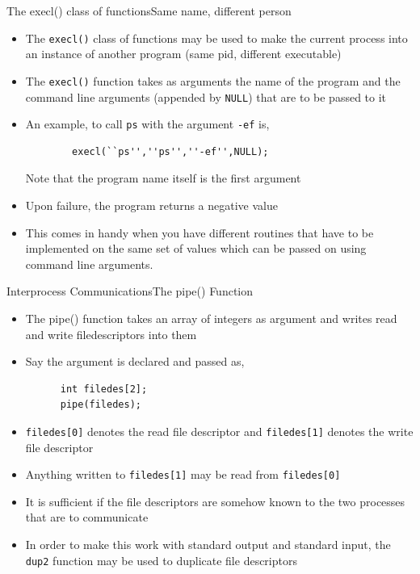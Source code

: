\documentclass{beamer}
\begin{document}
\begin{frame}[fragile]{The execl() class of functions}{Same name,
    different person}
  \begin{itemize}
    \item The \verb|execl()| class of functions may be used to make
      the current process into an instance of another program (same
      pid, different executable)
    \item The \verb|execl()| function takes as arguments the name of
      the program and the command line arguments (appended by
      \verb|NULL|) that are to be passed to it
      \item An example, to call \verb|ps| with the argument \verb|-ef|
        is,
    \begin{verbatim}
        execl(``ps'',''ps'',''-ef'',NULL);
    \end{verbatim}
    Note that the program name itself is the first argument
  \item Upon failure, the program returns a negative value
  \item This comes in handy when you have different routines that have
    to be implemented on the same set of values which can be passed on
    using command line arguments.
  \end{itemize}
\end{frame}

\begin{frame}[fragile]{Interprocess Communications}{The pipe() Function}
  \begin{itemize}
    \item The pipe() function takes an array of integers as argument
      and writes read and write filedescriptors into them
    \item Say the argument is declared and passed as,
    \begin{verbatim}
      int filedes[2];
      pipe(filedes);
    \end{verbatim}
    \item \verb|filedes[0]| denotes the read file descriptor and
      \verb|filedes[1]| denotes the write file descriptor
      \item Anything written to \verb|filedes[1]| may be read from
        \verb|filedes[0]|
      \item It is sufficient if the file descriptors are somehow
        known to the two processes that are to communicate
      \item In order to make this work with standard output and
        standard input, the \verb|dup2| function may be used to
        duplicate file descriptors
    \end{itemize}
\end{frame}
\end{document}
